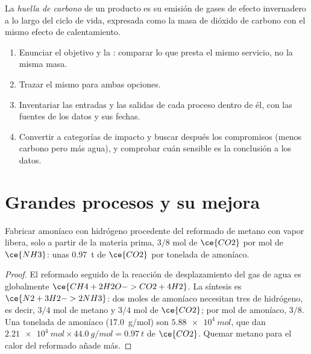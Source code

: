 \begin{definition}\label{def:b3:green-industrial:carbon-footprint}
La \emph{huella de carbono} de un producto es su
emisión de gases de efecto invernadero a lo largo del ciclo de vida, expresada como la masa de dióxido de carbono
con el mismo efecto de calentamiento.
\end{definition}

\begin{method}\label{met:b3:green-industrial:lca}
\begin{enumerate}
  \item Enunciar el objetivo y la : comparar lo que presta el mismo
        servicio, no la misma masa.
  \item Trazar el mismo  para ambas opciones.
  \item Inventariar las entradas y las salidas de cada proceso dentro de él, con las fuentes
        de los datos y sus fechas.
  \item Convertir a categorías de impacto y buscar después los compromisos (menos carbono pero
        más agua), y comprobar cuán sensible es la conclusión a los datos.
\end{enumerate}
\end{method}

\section{Grandes procesos y su mejora}

\begin{proposition}\label{prop:b3:green-industrial:smr}
Fabricar amoníaco con hidrógeno procedente del reformado de metano con vapor libera, solo a partir de la
materia prima, $3/8$ mol de $\ce{CO2}$ por mol de $\ce{NH3}$: unas \qty{0.97}{t} de $\ce{CO2}$ por tonelada de amoníaco.
\end{proposition}

\begin{proof}
El reformado seguido de la reacción de desplazamiento del gas de agua es globalmente $\ce{CH4 + 2H2O -> CO2 + 4H2}$. La síntesis
es $\ce{N2 + 3H2 -> 2NH3}$: dos moles de amoníaco necesitan tres de hidrógeno, es decir, $3/4$ mol de
metano y $3/4$ mol de $\ce{CO2}$; por mol de amoníaco, $3/8$. Una tonelada de amoníaco
(\qty{17.0}{g/mol}) son $\qty{5.88e4}{mol}$, que dan $\qty{2.21e4}{mol} \times \qty{44.0}{g/mol} = \qty{0.97}{t}$ de $\ce{CO2}$. Quemar metano
para el calor del reformado añade más.
\end{proof}


